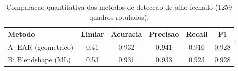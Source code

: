 \begin{table}[t]
\centering
\caption{Comparacao quantitativa dos metodos de deteccao de olho fechado
(1259 quadros rotulados).}
\label{tab:results}
\begin{tabular}{lccccc}
\hline
Metodo & Limiar & Acuracia & Precisao & Recall & F1 \\
\hline
A: EAR (geometrico) & 0.41 & 0.932 & 0.941 & 0.916 & 0.928 \\
B: Blendshape (ML) & 0.53 & 0.931 & 0.933 & 0.923 & 0.928 \\
\hline
\end{tabular}
\end{table}
